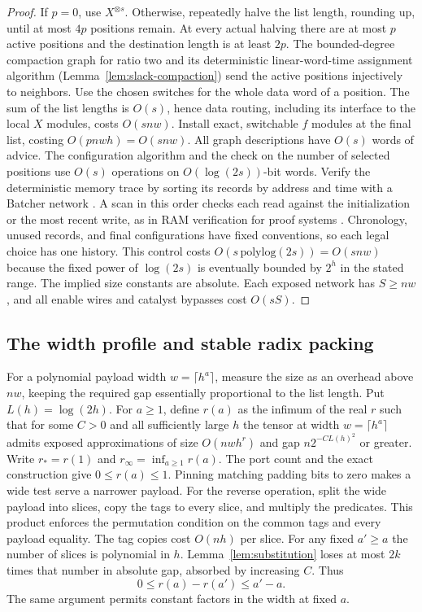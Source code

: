 \begin{proof}
If $p=0$, use $X^{\otimes s}$.
Otherwise, repeatedly halve the list length, rounding up, until at most
$4p$ positions remain. At every actual halving there are at most $p$
active positions and the destination length is at least $2p$.
The bounded-degree compaction graph for ratio two and its deterministic linear-word-time assignment algorithm (Lemma~\ref{lem:slack-compaction}) send the active positions injectively to neighbors.
Use the chosen switches for the whole data word of a position.
The sum of the list lengths is $O(s)$, hence data routing, including
its interface to the local $X$ modules, costs $O(snw)$. Install exact,
switchable $f$ modules at the final list, costing $O(pnwh)=O(snw)$.
All graph descriptions have $O(s)$ words of advice. The configuration
algorithm and the check on the number of selected positions use
$O(s)$ operations on $O(\log(2s))$-bit words. Verify the deterministic memory trace by sorting its records by address
and time with a Batcher network \cite{Batcher}. A scan in this order
checks each read against the initialization or the most recent write, as
in RAM verification for proof systems \cite{TinyRAM}. Chronology, unused records, and final configurations
have fixed conventions, so each legal choice has one history.
This control costs $O(s\,\mathrm{polylog}(2s))=O(snw)$ because the fixed
power of $\log(2s)$ is eventually bounded by $2^h$ in the stated
range. The implied size constants are absolute. Each exposed network
has $S\ge nw$, and all enable wires and catalyst bypasses cost $O(sS)$.
\end{proof}

\subsection{The width profile and stable radix packing}

For a polynomial payload width $w=\lceil h^a\rceil$, measure the size
as an overhead above $nw$, keeping the required gap essentially
proportional to the list length. Put $L(h)=\log(2h)$. For $a\ge1$,
define $r(a)$ as the infimum of the
real $r$ such that for some $C>0$ and all sufficiently large $h$ the
tensor at width $w=\lceil h^a\rceil$ admits exposed approximations of
size $O(nw h^r)$ and gap $n2^{-C L(h)^2}$ or greater. Write
$r_*=r(1)$ and $r_\infty=\inf_{a\ge1}r(a)$. The port count and the
exact construction give $0\le r(a)\le1$. Pinning matching padding
bits to zero makes a wide test serve a narrower payload. For the
reverse operation, split the wide payload into slices, copy the tags
to every slice, and multiply the predicates. This product enforces
the permutation condition on the common tags and every payload equality. The tag copies cost $O(nh)$ per slice.
For any fixed $a'\ge a$ the number of slices is polynomial in $h$.
Lemma~\ref{lem:substitution} loses at most $2k$ times that number
in absolute gap, absorbed by increasing $C$. Thus
\[
                  0\le r(a)-r(a')\le a'-a .
\]
The same argument permits constant factors in the width at fixed $a$.

